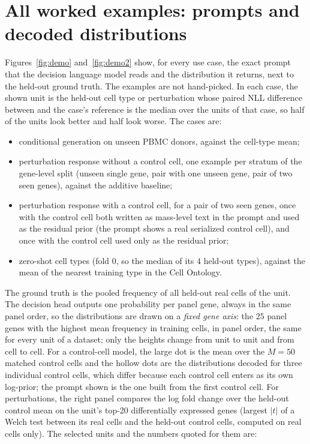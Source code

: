 \section{All worked examples: prompts and decoded distributions}\label{app:demo}
Figures~\ref{fig:demo} and~\ref{fig:demo2} show, for every use case, the exact prompt that the decision language model reads and the distribution it returns, next to the held-out ground truth.
The examples are not hand-picked.
In each case, the shown unit is the held-out cell type or perturbation whose paired NLL difference between \cad{} and the case's reference is the median over the units of that case, so half of the units look better and half look worse.
The cases are:
\begin{itemize}
\item conditional generation on unseen PBMC donors, against the cell-type mean;
\item perturbation response without a control cell, one example per stratum of the gene-level split (unseen single gene, pair with one unseen gene, pair of two seen genes), against the additive baseline;
\item perturbation response with a control cell, for a pair of two seen genes, once with the control cell both written as mass-level text in the prompt and used as the residual prior (the prompt shows a real serialized control cell), and once with the control cell used only as the residual prior;
\item zero-shot cell types (fold 0, so the median of its $4$ held-out types), against the mean of the nearest training type in the Cell Ontology.
\end{itemize}
The ground truth is the pooled frequency of all held-out real cells of the unit.
The decision head outputs one probability per panel gene, always in the same panel order, so the distributions are drawn on a \emph{fixed gene axis}: the $25$ panel genes with the highest mean frequency in training cells, in panel order, the same for every unit of a dataset; only the heights change from unit to unit and from cell to cell.
For a control-cell model, the large dot is the mean over the $M=50$ matched control cells and the hollow dots are the distributions decoded for three individual control cells, which differ because each control cell enters as its own log-prior; the prompt shown is the one built from the first control cell.
For perturbations, the right panel compares the log fold change over the held-out control mean on the unit's top-20 differentially expressed genes (largest $|t|$ of a Welch test between its real cells and the held-out control cells, computed on real cells only).
The selected units and the numbers quoted for them are:

